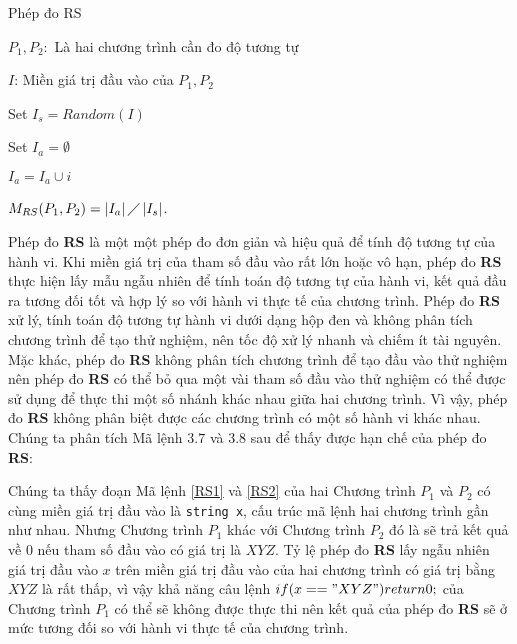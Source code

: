 \begin{algorithm}[H]
	\caption{Phép đo RS}
	\begin{algorithmic}	
		\item $P_{1}, P_{2}:$ Là hai chương trình cần đo độ tương tự
		\item $I$: Miền giá trị đầu vào của $P_{1}, P_{2}$
		\item Set $I_{s} = Random(I)$ 
		\item Set $I_{a} = \emptyset$ 
		  
				
				\State $I_{a} = I_{a} \cup i$		
				\EndIf
		\EndWhile
		\item $M_{RS}(P_{1}, P_{2}) = \left|I_{a}\right| \diagup \left|I_{s}\right| $. 
	\end{algorithmic}
\end{algorithm}


Phép đo \textbf{RS} là một một phép đo đơn giản và hiệu quả để tính độ tương tự của hành vi. Khi miền giá trị của tham số đầu vào rất lớn hoặc vô hạn, phép đo \textbf{RS} thực hiện lấy mẫu ngẫu nhiên để tính toán độ tương tự của hành vi, kết quả đầu ra tương đối tốt và hợp lý so với hành vi thực tế của chương trình. Phép đo \textbf{RS} xử lý, tính toán độ tương tự hành vi dưới dạng hộp đen và không phân tích chương trình để tạo thử nghiệm, nên tốc độ xử lý nhanh và chiếm ít tài nguyên. Mặc khác, phép đo \textbf{RS} không phân tích chương trình để tạo đầu vào thử nghiệm nên phép đo \textbf{RS} có thể bỏ qua một vài tham số đầu vào thử nghiệm có thể được sử dụng để thực thi một số nhánh khác nhau giữa hai chương trình. Vì vậy, phép đo \textbf{RS} không phân biệt được các chương trình có một số hành vi khác nhau. Chúng ta phân tích Mã lệnh $3.7$ và $3.8$ sau để thấy được hạn chế của phép đo \textbf{RS}:

\begin{minipage}[t]{0.45\linewidth}
	
\end{minipage}%
\hfill\vrule\hfill
\begin{minipage}[t]{0.45\linewidth} 
	
\end{minipage}%
 
Chúng ta thấy đoạn Mã lệnh \ref{RS1} và \ref{RS2} của hai Chương trình $P_{1}$ và $P_{2}$ có cùng miền giá trị đầu vào là \texttt{string x}, cấu trúc mã lệnh hai chương trình gần như nhau. Nhưng Chương trình $P_{1}$ khác với Chương trình $P_{2}$ đó là sẽ trả kết quả về $0$ nếu tham số đầu vào có giá trị là $XYZ$. Tỷ lệ phép đo \textbf{RS} lấy ngẫu nhiên giá trị đầu vào $x$ trên miền giá trị đầu vào của hai chương trình có giá trị bằng $XYZ$ là rất thấp, vì vậy khả năng câu lệnh $if (x == "XYZ") return 0;$ của Chương trình $P_{1}$ có thể sẽ không được thực thi nên kết quả của phép đo \textbf{RS} sẽ ở mức tương đối so với hành vi thực tế của chương trình.

